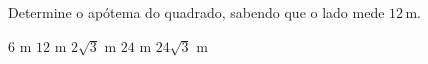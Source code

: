 \noindent\parbox{\linewidth}{

Determine o apótema do quadrado, sabendo que o lado mede $12$\,m.

$6$ m
$12$ m
$2\sqrt{3}$ m
$24$ m
$24\sqrt{3}$ m



}


